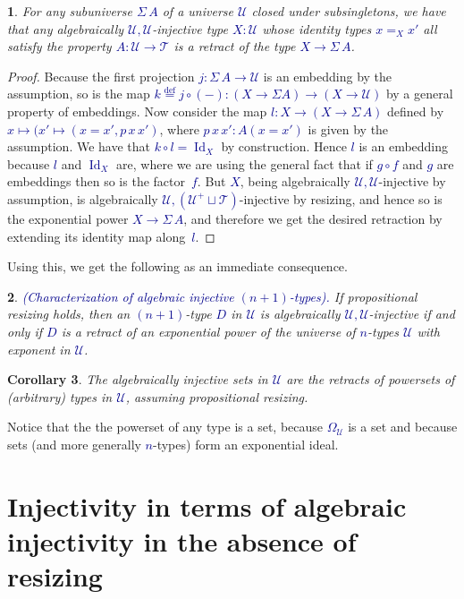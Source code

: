 \documentclass[10pt]{article}
\newcommand{\db}{\textcolor{darkblue}}
\newcommand{\df}[1]{\emph{\db{#1}}}
\newcommand{\m}[1]{\db{$#1$}}
\newcommand{\comp}{\mathrel{\circ}}
\newcommand{\U}{\mathcal{U}}
\newcommand{\T}{\mathcal{T}}
\newcommand{\Id}{\operatorname{Id}}
\newcommand{\eqdef}{\overset{\text{def}}{=}}
\newtheorem{numbered}{}
\newtheorem{corollary}[numbered]{Corollary}
\theoremstyle{definition}
\begin{document}
\begin{numbered}
  For any subuniverse \m{\Sigma \, A} of a universe \m{\U} closed
  under subsingletons, we have that any algebraically
  \m{\U,\U}-injective type \m{X:\U} whose identity types \m{x=_X x'}
  all satisfy the property \m{A:\U \to \T} is a retract of the type
  \m{X \to \Sigma \, A}.
\end{numbered}
\begin{proof}
  Because the first projection \m{j : \Sigma \, A \to \U} is an
  embedding by the assumption, so is the map \m{k \eqdef j \comp (-) :
    (X \to \Sigma A) \to (X \to \U)} by a general property of
  embeddings. Now consider the map \m{l : X \to (X \to \Sigma \, A)}
  defined by \m{x \mapsto (x' \mapsto (x=x', p \, x \, x')}, where
  \m{p \, x \, x' : A(x=x')} is given by the assumption. We have that
  \m{k \comp l = \Id_X} by construction. Hence \m{l} is an embedding
  because \m{l} and \m{\Id_X} are, where we are using the general fact
  that if \m{g \comp f} and \m{g} are embeddings then so is the
  factor~\m{f}.  But \m{X}, being algebraically \m{\U,\U}-injective by
  assumption, is algebraically \m{\U,(\U^+ \sqcup \T)}-injective by
  resizing, and hence so is the exponential power \m{X \to \Sigma \,
    A}, and therefore we get the desired retraction by extending its
  identity map along~\m{l}.
\end{proof}

Using this, we get the following as an immediate consequence.

\begin{numbered} \df{(Characterization of algebraic injective \m{(n+1)}-types).}  If propositional resizing holds, then an
  \m{(n+1)}-type \m{D} in \m{\U} is algebraically \m{\U,\U}-injective
  if and only if \m{D} is a retract of an exponential power of the
  universe of \m{n}-types \m{\U} with exponent in \m{\U}.
\end{numbered}

\begin{corollary}
  The algebraically injective sets in \m{\U} are the retracts of
  powersets of (arbitrary) types in \m{\U}, assuming propositional resizing.
\end{corollary}
\noindent Notice that the the powerset of any type is a set, because
\m{\Omega_\U} is a set and because sets (and more generally
\m{n}-types) form an exponential ideal.



\section{Injectivity in terms of algebraic injectivity in the absence of resizing}
\end{document}
